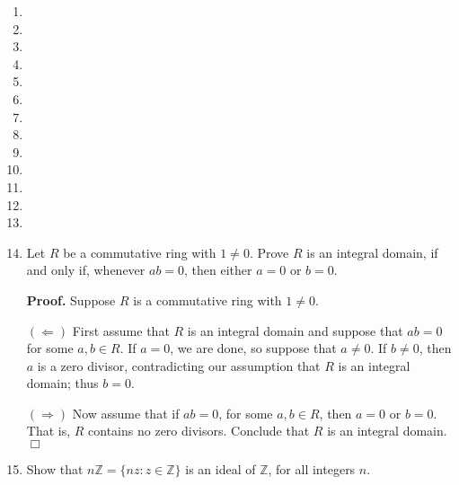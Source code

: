 \documentclass[9pt]{article}
\newcommand{\qed}{\hfill \ensuremath{\Box}}
\newcommand{\Z}{\mathbb{Z}}
\begin{document}
\begin{enumerate}
   \item 
   \item 
   \item 
   \item 
   \item 
   \item 
   \item 
   \item 
   \item 
   \item 
   \item 
   \item 
   \item 
   \item Let $R$ be a commutative ring with $1 \neq 0$. Prove $R$ is an integral
         domain, if and only if, whenever $ab = 0$, then either $a = 0$ or
         $b = 0$.
         
      \textbf{Proof.} Suppose $R$ is a commutative ring with $1 \neq 0$.
      
      $(\Leftarrow)$ First assume that $R$ is an integral domain and suppose that
      $ab = 0$ for some $a, b \in R$. If $a = 0$, we are done, so suppose that
      $a \neq 0$. If $b \neq 0$, then $a$ is a zero divisor, contradicting our
      assumption that $R$ is an integral domain; thus $b = 0$.
      
      $(\Rightarrow)$ Now assume that if $ab = 0$, for some $a, b \in R$, then
      $a = 0$ or $b = 0$. That is, $R$ contains no zero divisors. Conclude that
      $R$ is an integral domain. \qed
   \item Show that $n\Z = \{nz : z \in \Z\}$ is an ideal of $\Z$, for all
         integers $n$.
         

\end{enumerate}
\end{document}
